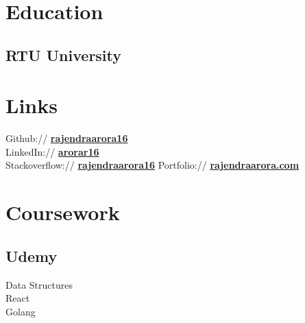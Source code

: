 \documentclass[]{deedy-resume-openfont}
\begin{document}
%
%

%
%

\begin{minipage}[t]{0.33\textwidth} 


\section{Education} 

\subsection{RTU University}
\sectionsep



\section{Links} 
Github:// \href{https://github.com/rajendraarora16}{\bf rajendraarora16} \\
LinkedIn://  \href{https://www.linkedin.com/in/arorar16/}{\bf arorar16} \\
Stackoverflow:// \href{https://stackoverflow.com/users/2802622/}{\bf rajendraarora16}
Portfolio:// \href{https://rajendraarora.com/}{\bf rajendraarora.com} \\



\section{Coursework}
\subsection{Udemy}
Data Structures \\
React \\
Golang \\
\sectionsep



\end{minipage}
\end{document}
